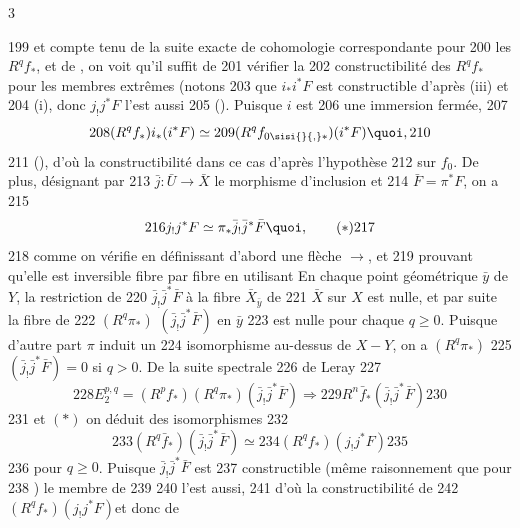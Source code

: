 3	\documentclass[10pt]{../fichiers-configuration-latex/smfart}
\begin{document}
   199	et compte tenu de la suite exacte de cohomologie correspondante pour
   200	les $R^{q}f_{\ast}$, et de , on voit qu'il suffit de
   201	vérifier la 
   202	constructibilité des $R^{q}f_{\ast}$ pour les membres extrêmes (notons
   203	que $i_{\ast}i^{\ast}F$ est constructible d'après  (iii) et 
   204	 (i), donc $j_{!}j^{\ast}F$ l'est aussi
   205	(). Puisque $i$ est 
   206	une immersion fermée,
   207	$$
   208	(R^{q}f_{\ast})i_{\ast}(i^{\ast}F)\simeq
   209	(R^{q}f_{0 \sisi{}{,} \ast})(i^{\ast}F){\quoi},
   210	$$
   211	(), d'où la constructibilité dans ce cas d'après l'hypothèse
   212	sur $f_{0}$. De plus, désignant par
   213	$\bar{j}:\bar{U}\rightarrow \bar{X}$ le morphisme d'inclusion et
   214	$\bar{F}=\pi^{\ast}F$, on a
   215	\begin{equation*}
   216	j_{!}j^{\ast}F\simeq \pi_{\ast}\bar{j}_{!}\bar{j}^{\ast}\bar{F}{\quoi},\tag{$\ast$}
   217	\end{equation*}
   218	comme on vérifie en définissant d'abord une flèche $\rightarrow$, et
   219	prouvant qu'elle est inversible fibre par fibre en utilisant  En chaque point géométrique $\bar{y}$ de $Y$, la restriction de
   220	$\bar{j}_{!}\bar{j}^{\ast}\bar{F}$ à la fibre $\bar{X}_{\bar{y}}$ de
   221	$\bar{X}$ sur $X$ est nulle, et par suite   la fibre de
   222	$(R^{q}\pi_{\ast})$ $(\bar{j}_{!}\bar{j}^{\ast}\bar{F})$ en $\bar{y}$
   223	est nulle pour chaque $q\geq 0$. Puisque d'autre part $\pi$ induit un
   224	isomorphisme au-dessus de $X-Y$, on a $(R^{q}\pi_{\ast})$
   225	$(\bar{j}_{!}\bar{j}^{\ast}\bar{F})=0$ si $q>0$. De la suite spectrale
   226	de Leray
   227	$$
   228	E^{p,q}_2=(R^{p}f_{\ast})(R^{q}\pi_{\ast})(\bar{j}_{!}\bar{j}^{\ast}\bar{F})\Longrightarrow
   229	R^{n}\bar{f}_{\ast}(\bar{j}_{!}\bar{j}^{\ast}\bar{F})
   230	$$
   231	et $(\ast)$ on déduit des isomorphismes
   232	$$
   233	(R^{q}\bar{f}_{\ast})(\bar{j}_{!}\bar{j}^{\ast}\bar{F})\simeq
   234	(R^{q}f_{\ast})(j_{!}j^{\ast}F)
   235	$$
   236	pour $q\geq 0$. Puisque $\bar{j}_{!}\bar{j}^{\ast}\bar{F}$ est
   237	constructible (même raisonnement que pour 
   238	) le membre de 
   239	
   240	 l'est aussi,
   241	d'où la constructibilité de
   242	$(R^{q}f_{\ast})(j_{!}j^{\ast}F)$\pageoriginale et donc de
\end{document}
